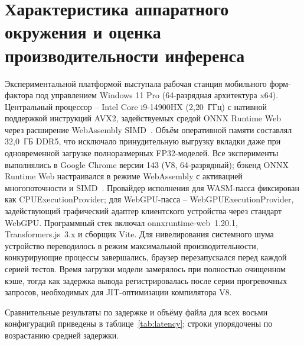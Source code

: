 \section{Характеристика аппаратного окружения и оценка производительности инференса}
\label{sec:характеристика_аппаратного_окружения_и_оценка_производительности_инференса}

Экспериментальной платформой выступала рабочая станция мобильного форм-фактора под управлением Windows 11 Pro (64-разрядная архитектура x64). Центральный процессор – Intel Core i9-14900HX (2{,}20~ГГц) с нативной поддержкой инструкций AVX2, задействуемых средой ONNX Runtime Web через расширение WebAssembly SIMD~\cite{wang2024anatomizing}. Объём оперативной памяти составлял 32{,}0~ГБ DDR5, что исключало принудительную выгрузку вкладки даже при одновременной загрузке полноразмерных FP32-моделей. Все эксперименты выполнялись в Google Chrome версии 143 (V8, 64-разрядный); бэкенд ONNX Runtime Web настраивался в режиме WebAssembly с активацией многопоточности и SIMD~\cite{jia2024empowering}. Провайдер исполнения для WASM-пасса фиксирован как CPUExecutionProvider; для WebGPU-пасса – WebGPUExecutionProvider, задействующий графический адаптер клиентского устройства через стандарт WebGPU. Программный стек включал onnxruntime-web~1.20.1, Transformers.js~3.x и сборщик Vite. Для нивелирования системного шума устройство переводилось в режим максимальной производительности, конкурирующие процессы завершались, браузер перезапускался перед каждой серией тестов. Время загрузки модели замерялось при полностью очищенном кэше, тогда как задержка вывода регистрировалась после серии прогревочных запросов, необходимых для JIT-оптимизации компилятора V8.

Сравнительные результаты по задержке и объёму файла для всех восьми конфигураций приведены в таблице~\ref{tab:latency}; строки упорядочены по возрастанию средней задержки.

